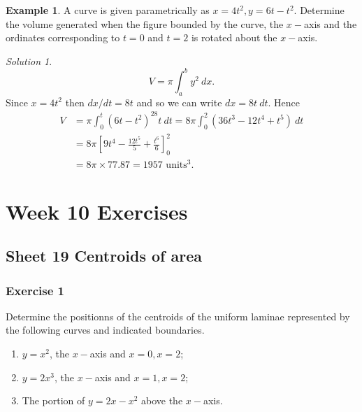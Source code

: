 \documentclass[
  11pt,
  oneside]{book}
\providecommand{\tightlist}{%
  \setlength{\itemsep}{0pt}\setlength{\parskip}{0pt}}
\newcommand{\slide}{}
\theoremstyle{definition}
\theoremstyle{definition}
\newtheorem{example}{Example}[chapter]
\theoremstyle{definition}
\theoremstyle{definition}
\theoremstyle{remark}
\newtheorem*{solution}{Solution}
\begin{document}
\slide

\begin{example}
A curve is given parametrically as \(x=4t^2, y = 6t-t^2\). Determine the volume generated when the figure bounded by the curve, the \(x-\)axis and the ordinates corresponding to \(t=0\) and \(t=2\) is rotated about the \(x-\)axis.
\end{example}

\begin{solution}
\[
V = \pi\int_a^b y^2\ dx.
\]
Since \(x=4t^2\) then \(dx/dt = 8t\) and so we can write \(dx = 8t\ dt\). Hence
\begin{align*}
V& = \pi\int_0^t(6t-t^2)^28t\ dt = 8\pi\int_0^2(36t^3-12t^4+t^5)\ dt\\
& = 8\pi\left[9t^4-\frac{12t^5}5+\frac{t^6}6\right]_0^2\\
&= 8\pi\times77.87 = 1957 \text{ units}^3.
\end{align*}
\end{solution}

\chapter*{Week 10 Exercises}\label{week-10-exercises}

\section{Sheet 19 Centroids of area}\label{sheet-19-centroids-of-area}

\slide

\subsection*{Exercise 1}\label{exercise-1-10}

Determine the positionns of the centroids of the uniform laminae represented by the following curves and indicated boundaries.

\begin{enumerate}
\def\labelenumi{\arabic{enumi}.}
\tightlist
\item
  \(y=x^2\), the \(x-\)axis and \(x=0, x=2\);
\item
  \(y=2x^3\), the \(x-\)axis and \(x=1, x=2\);
\item
  The portion of \(y=2x-x^2\) above the \(x-\)axis.
\end{enumerate}
\end{document}
